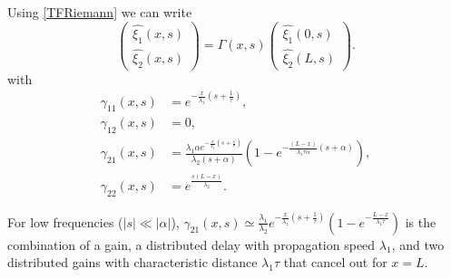 \documentclass[a4paper, 10pt, conference]{ieeeconf}      %
\begin{document}
Using \eqref{TFRiemann} we can write 
\begin{equation} \label{vqcongested}
\begin{pmatrix}
	\hat{\xi_{1}}(x,s)\\
	\hat{\xi_{2}}(x,s)
\end{pmatrix} = 
\Gamma(x,s)
\begin{pmatrix}
	\hat{\xi_{1}}\left(0,s\right)\\
	\hat{\xi_{2}}\left(L,s\right)
\end{pmatrix}.
\end{equation}
with 
\begin{subequations}
\begin{align}
\gamma_{11}\left(x,s\right)&=
e^{-\frac{x}{\lambda_{1}}\left(s+\frac{1}{\tau}\right)} , \\
\gamma_{12}\left(x,s\right)&=0, \\
\gamma_{21}\left(x,s\right)&=
\frac{\lambda_{1} \alpha e^{-\frac{x}{\lambda_{1}} \left( s + \frac{1}{\tau} \right)}}
{\lambda_{2}\left(s + \alpha\right)}
\left(
	1 -
	e^{-\frac{\left(L - x\right)
		}{
		\lambda_{1}\tau\alpha
		}
		\left(s+\alpha\right)
		}
\right)
, \\
\gamma_{22}\left(x,s\right)&=e^{\frac{s\left(L-x\right)}{\lambda_{2}}}.
\end{align}
\end{subequations}

For low frequencies ($\left|s\right|\ll\left|\alpha\right|$), 
$\gamma_{21}\left(x,s\right)
\simeq
\frac{\lambda_{1}}{\lambda_{2}}
e^{-\frac{x}{\lambda_{1}} \left( s + \frac{1}{\tau} \right)}
\left(
	1 -
	e^{-\frac{L-x}{\lambda_{1}\tau}}
\right)
$
is the combination of a gain, a distributed delay with propagation speed $\lambda_{1}$, and two distributed gains with characteristic distance $\lambda_{1}\tau$ that cancel out for $x = L$.
\end{document}
